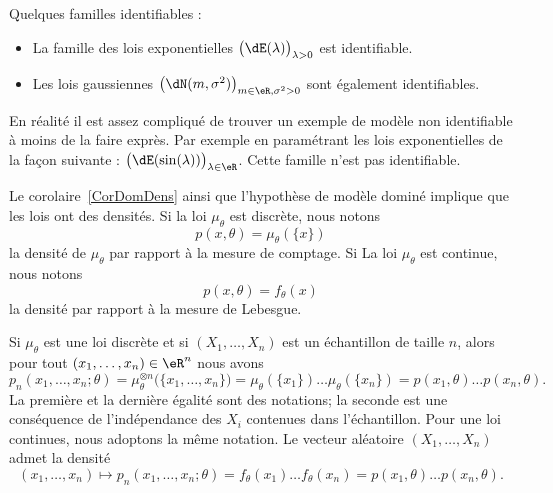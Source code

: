 \begin{example}
	Quelques familles identifiables :
	\begin{itemize}
		\item
		      La famille des lois exponentielles \( \big( \dE(\lambda) \big)_{\lambda>0}\) est identifiable.
		\item
		      Les lois gaussiennes \( \big( \dN(m,\sigma^2) \big)_{m\in\eR,\sigma^2>0}\) sont également identifiables.
	\end{itemize}
	En réalité il est assez compliqué de trouver un exemple de modèle non identifiable à moins de la faire exprès. Par exemple en paramétrant les lois exponentielles de la façon suivante : \( \big( \dE(\sin(\lambda)) \big)_{\lambda\in\eR}\). Cette famille n'est pas identifiable.
\end{example}

Le corolaire~\ref{CorDomDens} ainsi que l'hypothèse de modèle dominé implique que les lois ont des densités. Si la loi \( \mu_{\theta}\) est discrète, nous notons
\begin{equation}
	p(x,\theta)=\mu_{\theta}(\{ x \})
\end{equation}
la densité de \( \mu_{\theta}\) par rapport à la mesure de comptage. Si La loi \( \mu_{\theta}\) est continue, nous notons
\begin{equation}
	p(x,\theta)=f_{\theta}(x)
\end{equation}
la densité par rapport à la mesure de Lebesgue.

Si \( \mu_{\theta}\) est une loi discrète et si \( (X_1,\ldots,X_n)\) est un échantillon de taille \( n\), alors pour tout \( (x_1,\ldots,x_n)\in\eR^n\) nous avons
\begin{equation}
	p_n(x_1,\ldots,x_n;\theta)=\mu_{\theta}^{\otimes n}\big( \{ x_1,\ldots,x_n \} \big)=\mu_{\theta}(\{ x_1 \})\ldots\mu_{\theta}(\{ x_n \})=p(x_1,\theta)\ldots p(x_n,\theta).
\end{equation}
La première et la dernière égalité sont des notations; la seconde est une conséquence de l'indépendance des \( X_i\) contenues dans l'échantillon. Pour une loi continues, nous adoptons la même notation. Le vecteur aléatoire \( (X_1,\ldots,X_n)\) admet la densité
\begin{equation}
	(x_1,\ldots,x_n)\mapsto p_n(x_1,\ldots,x_n;\theta)=f_{\theta}(x_1)\ldots f_{\theta}(x_n)=p(x_1,\theta)\ldots p(x_n,\theta).
\end{equation}


